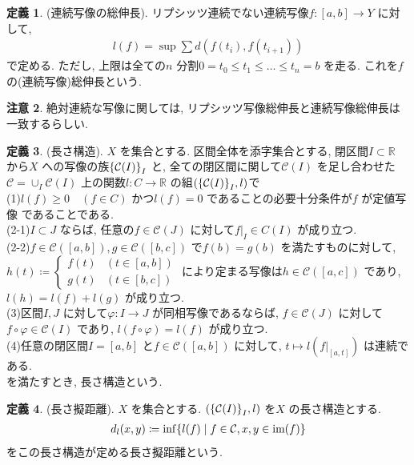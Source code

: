 \documentclass[10pt, fleqn, label-section=none]{bxjsarticle}
\theoremstyle{definition}
\newtheorem{dfn}{定義}[section]
\newtheorem{remark}[dfn]{注意}
\newcommand{\cbra}[1]{\mleft\{#1\mright\}}
\renewcommand{\;}{\, ; \,}
\begin{document}
\begin{dfn}(連続写像の総伸長). 
リプシッツ連続でない連続写像$f : [a, b] \rightarrow Y$ に対して, 
\begin{align*} l(f) = \sup \sum d(f(t_i), f(t_{i+1}))  \end{align*}
で定める. ただし, 上限は全ての$n$ 分割$0 = t_0 \leq t_1 \leq  \ldots \leq t_n = b $ を走る. これを$f$ の(連続写像)総伸長という.
\end{dfn}

\begin{remark}
絶対連続な写像に関しては, リプシッツ写像総伸長と連続写像総伸長は一致するらしい. 
\end{remark}



\begin{dfn}(長さ構造). $X$ を集合とする. 区間全体を添字集合とする, 閉区間$I \subset \mathbb R$ から$X$  への写像の族$\cbra{\mathcal C(I)}_I$ と, 全ての閉区間に関して$\mathcal C (I)$ を足し合わせた$\mathcal C = \cup_{I} \mathcal C (I)$ 上の関数$l: C \rightarrow \mathbb R$ の組$(\cbra{\mathcal C(I)}_I, l)$で\\
(1)$l(f) \geq0 \quad (f \in C)$ かつ$l(f) = 0$ であることの必要十分条件が$f$ が定値写像 であることである. \\
(2-1)$I \subset J $ ならば, 任意の$f \in \mathcal C(J)$ に対して$f |_I \in C(I)$ が成り立つ.  \\
(2-2)$f \in \mathcal C([a,b]), g \in \mathcal C([b,c])$ で$f(b) = g(b)$ を満たすものに対して, $h(t) \coloneqq \begin{cases} f(t) &(t \in [a,b]) \\ g(t) &(t \in [b,c])\end{cases} $ により定まる写像は$h \in \mathcal C([a,c])$ であり, $l(h) = l(f) + l(g)$ が成り立つ. \\
(3)区間$I, J$ に対して$\varphi : I \rightarrow J$ が同相写像であるならば, $f \in \mathcal C(J)$ に対して$f \circ \varphi \in \mathcal C(I)$ であり, $l(f\circ \varphi) = l(f)$ が成り立つ. \\
(4)任意の閉区間$I = [a, b]$ と$f \in \mathcal C([a,b])$ に対して, $t \mapsto l(f|_{[a, t]})$ は連続である. \\
を満たすとき, 長さ構造という. 

\end{dfn}

\begin{dfn}(長さ擬距離). $X$ を集合とする. $(\cbra{\mathcal C(I)}_I, l)$ を$X$ の長さ構造とする.    
\begin{align*} d_l (x, y) \coloneqq \inf \cbra{l(f) \mid f \in \mathcal C , x, y \in \textrm{im}(f) }\end{align*}
をこの長さ構造が定める長さ擬距離という. 
\end{dfn}
\end{document}
